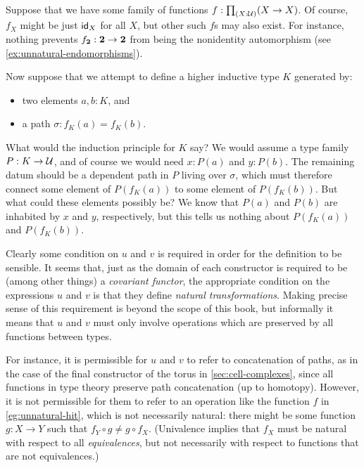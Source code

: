 \begin{eg}\label{eg:unnatural-hit}
  Suppose that we have some family of functions $f:\prd{X:\type} (X\to X)$.
  Of course, $f_X$ might be just $\idfunc[X]$ for all $X$, but other such $f$s may also exist.
  For instance, nothing prevents $f_{\bool}:\bool\to\bool$ from being the nonidentity automorphism (see \autoref{ex:unnatural-endomorphisms}).

  Now suppose that we attempt to define a higher inductive type $K$ generated by:
  \begin{itemize}
  \item two elements $a,b:K$, and
  \item a path $\sigma:f_K(a)=f_K(b)$.
  \end{itemize}
  What would the induction principle for $K$ say?
  We would assume a type family $P:K\to\type$, and of course we would need $x:P(a)$ and $y:P(b)$.
  The remaining datum should be a dependent path in $P$ living over $\sigma$, which must therefore connect some element of $P(f_K(a))$ to some element of $P(f_K(b))$.
  But what could these elements possibly be?
  We know that $P(a)$ and $P(b)$ are inhabited by $x$ and $y$, respectively, but this tells us nothing about $P(f_K(a))$ and $P(f_K(b))$.
\end{eg}

Clearly some condition on $u$ and $v$ is required in order for the definition to be sensible.
It seems that, just as the domain of each constructor is required to be (among other things) a \emph{covariant functor}, the appropriate condition on the expressions $u$ and $v$ is that they define \emph{natural transformations}.
Making precise sense of this requirement is beyond the scope of this book, but informally it means that $u$ and $v$ must only involve operations which are preserved by all functions between types.

For instance, it is permissible for $u$ and $v$ to refer to concatenation of paths, as in the case of the final constructor of the torus in \autoref{sec:cell-complexes}, since all functions in type theory preserve path concatenation (up to homotopy).
However, it is not permissible for them to refer to an operation like the function $f$ in \autoref{eg:unnatural-hit}, which is not necessarily natural: there might be some function $g:X\to Y$ such that $f_Y \circ g \neq g\circ f_X$.
(Univalence implies that $f_X$ must be natural with respect to all \emph{equivalences}, but not necessarily with respect to functions that are not equivalences.)

